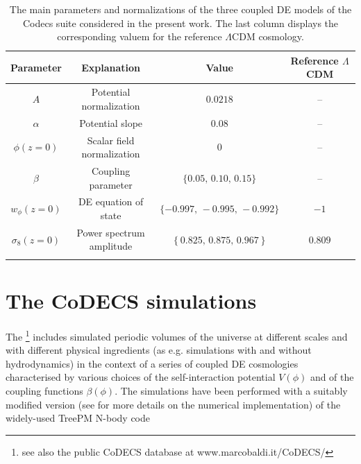 \begin{table}
\tiny
\centering{}\label{tab:models} %
\begin{tabular}{ccc|c}
\textbf{Parameter}  & \textbf{Explanation}  & \textbf{Value}  & \textbf{Reference $\Lambda$CDM}\tabularnewline
\hline 
\hline 
$A$  & Potential normalization  & $0.0218$  & -- \tabularnewline
$\alpha$  & Potential slope  & $0.08$  & -- \tabularnewline
$\phi(z=0)$  & Scalar field normalization  & $0$  & -- \tabularnewline
$\beta$  & Coupling parameter  & $\{0.05,\,0.10,\,0.15\}$  & -- \tabularnewline
$w_{\phi}(z=0)$  & DE equation of state  & $\{-0.997,\,-0.995,\,-0.992\}$  & $-1$ \tabularnewline
$\sigma_{8}(z=0)$  & Power spectrum amplitude  & $\left\{ 0.825,\,0.875,\,0.967\right\} $  & $0.809$ \tabularnewline
\hline 
\small
\end{tabular}
\caption[Parameters of the coupled DE models with constant coupling.]{\label{tab:normalization-conventions-codecs} The main parameters
and normalizations of the three coupled DE models of the Codecs
suite considered in the present work. The last column displays the
corresponding valuem for the reference $\Lambda$CDM cosmology.}
\end{table}
\normalsize


\section{The CoDECS simulations}

The %
\footnote{see also the public {\small{}{}{}{}{}{}{}{}{}CoDECS} database
at www.marcobaldi.it/CoDECS/%
}{\small{} includes simulated periodic volumes of the universe at different
scales and with different physical ingredients (as e.g. simulations
with and without hydrodynamics) in the context of a series of coupled
DE cosmologies characterised by various choices of the self-interaction
potential $V(\phi)$ and of the coupling functions $\beta(\phi)$.
The simulations have been performed with a suitably modified version
(see \citep{baldi_codecs_2012} for more details on the numerical
implementation) of the widely-used TreePM N-body code }

